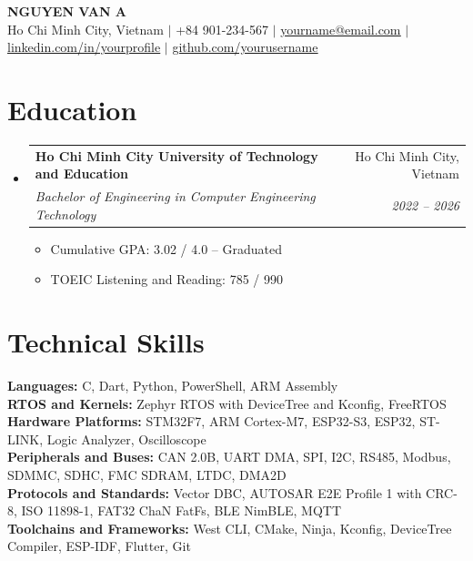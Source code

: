 \documentclass[letterpaper,9.2pt]{article}
\makeatletter
\newcommand{\resumeItem}[1]{
  \item\small{
    {#1 \vspace{-2.8pt}}
  }
}
\newcommand{\resumeSubheading}[4]{
  \vspace{-3pt}\item
    \begin{tabular*}{0.98\textwidth}[t]{l@{\extracolsep{\fill}}r}
      \textbf{#1} & #2 \\
      \textit{\small#3} & \textit{\small #4} \\
    \end{tabular*}\vspace{-6pt}
}
\newcommand{\resumeSubHeadingListStart}{\begin{itemize}[leftmargin=0.15in, label={}]}
\newcommand{\resumeSubHeadingListEnd}{\end{itemize}\vspace{-5pt}}
\newcommand{\resumeItemListStart}{\begin{itemize}[leftmargin=0.15in]}
\newcommand{\resumeItemListEnd}{\end{itemize}\vspace{-3pt}}
\makeatother
\begin{document}
\begin{center}
    \textbf{\Large \scshape NGUYEN VAN A} \\ \vspace{1pt}
    \small Ho Chi Minh City, Vietnam $|$ +84 901-234-567 $|$ \href{mailto:yourname@email.com}{\underline{yourname@email.com}} $|$
    \href{https://linkedin.com/in/yourprofile}{\underline{linkedin.com/in/yourprofile}} $|$
    \href{https://github.com/yourusername}{\underline{github.com/yourusername}}
\end{center}
\vspace{-9pt}

\section{Education}
  \resumeSubHeadingListStart
    \resumeSubheading
      {Ho Chi Minh City University of Technology and Education}{Ho Chi Minh City, Vietnam}
      {Bachelor of Engineering in Computer Engineering Technology}{2022 -- 2026}
      \resumeItemListStart
        \resumeItem{Cumulative GPA: 3.02 / 4.0 -- Graduated}
        \resumeItem{TOEIC Listening and Reading: 785 / 990}
      \resumeItemListEnd
  \resumeSubHeadingListEnd

\section{Technical Skills}
 \begin{itemize}[leftmargin=0.15in, label={}]
    \small{\item{
     \textbf{Languages:} C, Dart, Python, PowerShell, ARM Assembly \\
     \textbf{RTOS and Kernels:} Zephyr RTOS with DeviceTree and Kconfig, FreeRTOS \\
     \textbf{Hardware Platforms:} STM32F7, ARM Cortex-M7, ESP32-S3, ESP32, ST-LINK, Logic Analyzer, Oscilloscope \\
     \textbf{Peripherals and Buses:} CAN 2.0B, UART DMA, SPI, I2C, RS485, Modbus, SDMMC, SDHC, FMC SDRAM, LTDC, DMA2D \\
     \textbf{Protocols and Standards:} Vector DBC, AUTOSAR E2E Profile 1 with CRC-8, ISO 11898-1, FAT32 ChaN FatFs, BLE NimBLE, MQTT \\
     \textbf{Toolchains and Frameworks:} West CLI, CMake, Ninja, Kconfig, DeviceTree Compiler, ESP-IDF, Flutter, Git
    }}
 \end{itemize}
 \vspace{-6pt}
\end{document}

